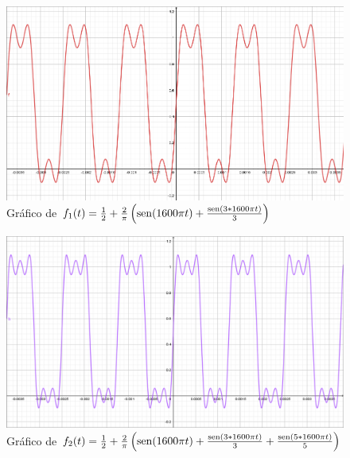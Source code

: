 \documentclass[11pt,twoside,a4paper]{book}
\begin{document}
\begin{figure}
    \centering
    \includegraphics[width=.950\textwidth]{figuras/grafiof1malha.png}
    \caption{Gráfico de $f_1(t) = \frac{1}{2} + \frac{2}{\pi} \left( {\rm sen}( 1600 \pi t) + \frac{{\rm sen}( 3*1600 \pi t)}{3}  \right)  $}
    \label{fig:2}
\end{figure}


\begin{figure}
    \centering
    \includegraphics[width=.950\textwidth]{figuras/grafiof2malha.png}
    \caption{Gráfico de $f_2(t) = \frac{1}{2} + \frac{2}{\pi} \left( {\rm sen}( 1600 \pi t) + \frac{{\rm sen}( 3*1600 \pi t)}{3}   + \frac{{\rm sen}( 5*1600 \pi t)}{5} \right)  $}
    \label{fig:3}
\end{figure}
\end{document}
